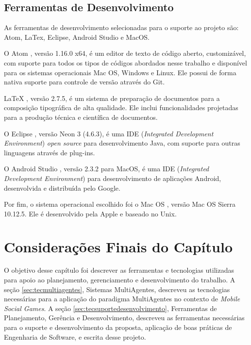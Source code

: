     \subsection{Ferramentas de Desenvolvimento}
    \label{sec:tecferramentasdesenvolvimento}

As ferramentas de desenvolvimento selecionadas para o suporte ao projeto são:
Atom, LaTex, Eclipse, Android Studio e MacOS.

O Atom \cite{atom}, versão 1.16.0 x64, é um editor de texto de código aberto,
customizável, com suporte para todos os tipos de códigos abordados nesse
trabalho e disponível para os sistemas operacionais Mac OS, Windows e Linux.
Ele possui de forma nativa suporte para controle de versão através do Git.

LaTeX \cite{latex}, versão 2.7.5, é um sistema de preparação de documentos para
a composição tipográfica de alta qualidade. Ele inclui funcionalidades
projetadas para a produção técnica e científica de documentos.

O Eclipse \cite{eclipse}, versão Neon 3 (4.6.3), é uma IDE (\textit{Integrated
Development Environment}) \textit{open source} para desenvolvimento Java, com
suporte para outras linguagens através de plug-ins.

O Android Studio \cite{androidStudio}, versão 2.3.2 para MacOS, é uma IDE
(\textit{Integrated Development Environment}) para desenvolvimento de
aplicações Android, desenvolvida e distribuída pelo Google.

Por fim, o sistema operacional escolhido foi o Mac OS \cite{macos}, versão Mac
OS Sierra 10.12.5. Ele é desenvolvido pela Apple e baseado no Unix.

\section{Considerações Finais do Capítulo}

O objetivo desse capítulo foi descrever as ferramentas e tecnologias utilizadas
para apoio ao planejamento, gerenciamento e desenvolvimento do trabalho. A
seção \ref{sec:tecmultiagentes}, Sistemas MultiAgentes, descreveu as
tecnologias necessárias para a aplicação do paradigma MultiAgentes no contexto
de \textit{Mobile Social Games}. A seção \ref{sec:tecsuportedesenvolvimento},
Ferramentas de Planejamento, Gerência e Desenvolvimento, descreveu as
ferramentas necessárias para o suporte e desenvolvimento da proposta, aplicação
de boas práticas de Engenharia de Software, e escrita desse projeto.
